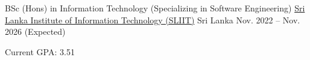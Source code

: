 

\begin{cventries}

  \cventry
    {BSc (Hons) in Information Technology (Specializing in Software Engineering)} %
    {\href{https://www.sliit.lk}{Sri Lanka Institute of Information Technology (SLIIT)}} %
    {Sri Lanka} %
    {Nov. 2022 -- Nov. 2026 (Expected)} %
    {
      \begin{cvitems} %
        \item {Current GPA: 3.51}
      \end{cvitems}
    }

\end{cventries}
